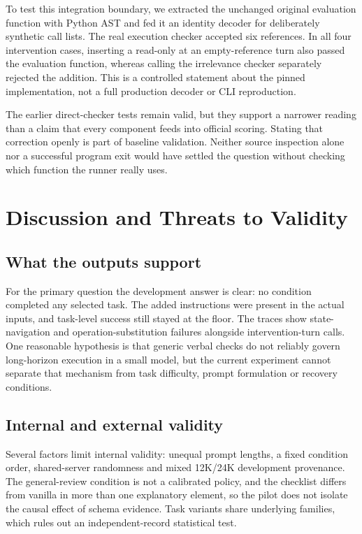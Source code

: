 \documentclass[conference]{IEEEtran}
\newcommand{\code}[1]{\texttt{\detokenize{#1}}}
\begin{document}
To test this integration boundary, we extracted the unchanged original evaluation function with Python AST and fed it an identity decoder for deliberately synthetic call lists. The real execution checker accepted six references. In all four intervention cases, inserting a read-only \code{pwd()} at an empty-reference turn also passed the evaluation function, whereas calling the irrelevance checker separately rejected the addition. This is a controlled statement about the pinned implementation, not a full production decoder or CLI reproduction.

The earlier direct-checker tests remain valid, but they support a narrower reading than a claim that every component feeds into official scoring. Stating that correction openly is part of baseline validation. Neither source inspection alone nor a successful program exit would have settled the question without checking which function the runner really uses.

\section{Discussion and Threats to Validity}
\subsection{What the outputs support}
For the primary question the development answer is clear: no condition completed any selected task. The added instructions were present in the actual inputs, and task-level success still stayed at the floor. The traces show state-navigation and operation-substitution failures alongside intervention-turn calls. One reasonable hypothesis is that generic verbal checks do not reliably govern long-horizon execution in a small model, but the current experiment cannot separate that mechanism from task difficulty, prompt formulation or recovery conditions.

\subsection{Internal and external validity}
Several factors limit internal validity: unequal prompt lengths, a fixed condition order, shared-server randomness and mixed 12K/24K development provenance. The general-review condition is not a calibrated policy, and the checklist differs from vanilla in more than one explanatory element, so the pilot does not isolate the causal effect of schema evidence. Task variants share underlying families, which rules out an independent-record statistical test.
\end{document}
